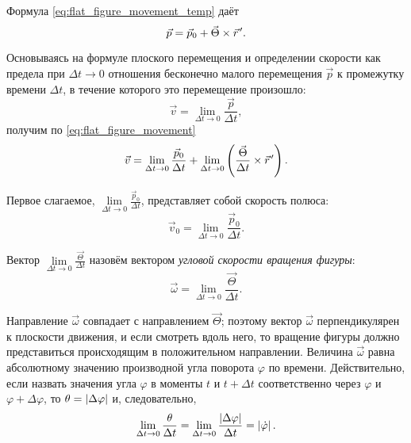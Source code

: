 Формула \ref{eq:flat_figure_movement_temp} даёт
\begin{equation}
  \label{eq:flat_figure_movement}
  \vec{p} = \vec{p}_0 + \crossprod{\vec{\Theta}}{\pvec{r}}.
\end{equation}

Основываясь на формуле плоского перемещения и определении скорости как предела
при $\Delta t \to 0$ отношения бесконечно малого перемещения $\vec{p}$ к
промежутку времени $\Delta t$, в течение которого это перемещение произошло:
\begin{equation*}
  \vec{v} = \lim_{\Delta t \to 0} \frac{\vec{p}}{\Delta t},
\end{equation*}
получим по \ref{eq:flat_figure_movement}
\begin{equation}
  \label{eq:figure_velocity_temp}
  \vec{v} = \lim_{\Delta t \to 0} \frac{\vec{p}_0}{\Delta t} +
    \lim_{\Delta t \to 0} \paren{\crossprod{\frac{\vec{\Theta}}{\Delta t}}
    {\pvec{r}}}.
\end{equation}

Первое слагаемое, $\lim\limits_{\Delta t \to 0} \frac{\vec{p}_0}{\Delta t}$,
представляет собой скорость полюса:
\begin{equation}
  \label{eq:figure_pole_velocity}
  \vec{v}_0 = \lim_{\Delta t \to 0} \frac{\vec{p}_0}{\Delta t}.
\end{equation}

Вектор $\lim\limits_{\Delta t \to 0} \frac{\vec{\Theta}}{\Delta t}$ назовём
вектором \textit{угловой скорости вращения фигуры}:
\begin{equation}
  \label{eq:figure_angular_velocity}
  \vec{\omega} = \lim_{\Delta t \to 0} \frac{\vec{\Theta}}{\Delta t}.
\end{equation}

Направление $\vec{\omega}$ совпадает с направлением $\vec{\Theta}$; поэтому
вектор $\vec{\omega}$ перпендикулярен к плоскости движения, и если смотреть
вдоль него, то вращение фигуры должно представиться происходящим в положительном
направлении. Величина $\vec{\omega}$ равна абсолютному значению производной угла
поворота $\varphi$ по времени. Действительно, если назвать значения угла
$\varphi$ в моменты $t$ и $t + \Delta t$ соответственно через $\varphi$ и
$\varphi + \Delta \varphi$, то $\theta = \left|\Delta \varphi\right|$ и, следовательно,
\begin{equation*}
  \lim_{\Delta t \to 0} \frac{\theta}{\Delta t} = \lim_{\Delta t \to 0}
  \frac{\left|\Delta \varphi\right|}{\Delta t} = \left|\dot{\varphi}\right|.
\end{equation*}

